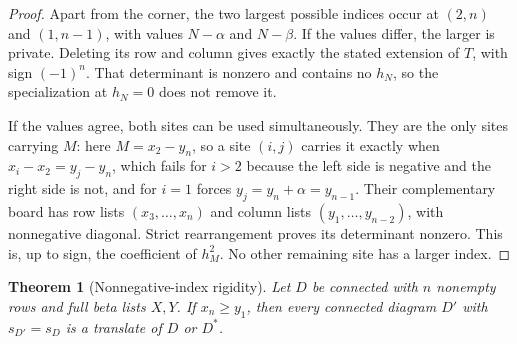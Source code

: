 \documentclass[11pt,a4paper]{amsart}
\numberwithin{equation}{section}
\theoremstyle{plain}
\newtheorem{theorem}{Theorem}[section]
\theoremstyle{definition}
\begin{document}
\begin{proof}
Apart from the corner, the two largest possible indices occur at
\((2,n)\) and \((1,n-1)\), with values \(N-\alpha\) and \(N-\beta\).
If the values differ, the larger is private.  Deleting its row and column
gives exactly the stated extension of \(T\), with sign \((-1)^n\).
That determinant is nonzero and contains no \(h_N\), so the specialization
at \(h_N=0\) does not remove it.

If the values agree, both sites can be used simultaneously.  They are the
only sites carrying \(M\): here \(M=x_2-y_n\), so a site \((i,j)\) carries it
exactly when \(x_i-x_2=y_j-y_n\), which fails for \(i>2\) because the left
side is negative and the right side is not, and for \(i=1\) forces
\(y_j=y_n+\alpha=y_{n-1}\).  Their complementary board has row lists
\((x_3,\ldots,x_n)\) and column lists \((y_1,\ldots,y_{n-2})\), with
nonnegative diagonal.  Strict rearrangement proves its determinant nonzero.
This is, up to sign, the coefficient of \(h_M^2\).  No other remaining site
has a larger index.
\end{proof}

\begin{theorem}[Nonnegative-index rigidity]\label{thm:nonnegative-rigidity}
Let \(D\) be connected with \(n\) nonempty rows and full beta lists \(X,Y\).
If \(x_n\ge y_1\), then every connected diagram \(D'\) with \(s_{D'}=s_D\)
is a translate of \(D\) or \(D^*\).
\end{theorem}
\end{document}
